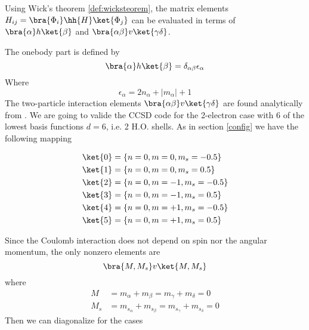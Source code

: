 Using Wick's theorem \ref{def:wicksteorem}, the matrix elements $H_{ij} = \bra{\Phi_i}\hh{H}\ket{\Phi_j}$ can be evaluated in terms of $\bra{\alpha}h\ket{\beta}$ and $\bra{\alpha\beta}v\ket{\gamma \delta}$.

The onebody part is defined by
\begin{equation}
\bra{\alpha}h\ket{\beta} = \delta_{\alpha \beta} \epsilon_\alpha
  \label{onebodyinteraction}
\end{equation}
%
Where
\begin{equation}
\epsilon_\alpha = 2n_\alpha + |m_\alpha| + 1
\end{equation}
%
The two-particle interaction elements $\bra{\alpha\beta}v\ket{\gamma \delta}$ are found analytically from \cite{rontani}. We are going to valide the CCSD code for the 2-electron case with 6 of the lowest basis functions $d=6$, i.e. 2 H.O. shells. As in section \ref{config} we have the following mapping

\begin{align*}
  \ket{0} & = \{n=0, m=0, m_s = -0.5\} \\ 
  \ket{1} & = \{n=0, m=0, m_s = 0.5\} \\
  \ket{2} & = \{n=0, m=-1, m_s = -0.5\} \\
  \ket{3} & = \{n=0, m=-1, m_s = 0.5\} \\
  \ket{4} & = \{n=0, m=+1, m_s = -0.5\} \\
  \ket{5} & = \{n=0, m=+1, m_s = 0.5\}   
\end{align*}
%
\begin{figure}[ht]
\centering
\scalebox{0.7}{}
\end{figure}
%
Since the Coulomb interaction does not depend on spin nor the angular momentum, the only nonzero elements are 
\begin{equation}
\bra{M, M_s} v \ket{M, M_s}
  \label{equation2}
\end{equation}
%
where
%
\begin{align}
  M & = m_\alpha + m_\beta = m_\gamma + m_\delta = 0 \\
  M_s & = m_{s_\alpha} + m_{s_\beta} = m_{s_\gamma} + m_{s_\delta} = 0
 \end{align}
%
Then we can diagonalize for the cases 

